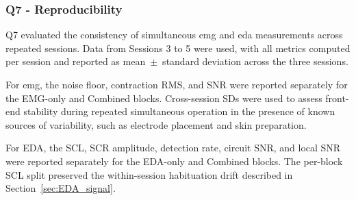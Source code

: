 \subsubsection{Q7 - Reproducibility}
\label{sec:q7_reproducibility}

Q7 evaluated the consistency of simultaneous \gls{emg} and \gls{eda} measurements across repeated sessions. Data from Sessions 3 to 5 were used, with all metrics computed per session and reported as mean~$\pm$~standard deviation across the three sessions.

For \gls{emg}, the noise floor, contraction RMS, and SNR were reported separately for the EMG-only and Combined blocks. Cross-session SDs were used to assess front-end stability during repeated simultaneous operation in the presence of known sources of variability, such as electrode placement and skin preparation.

For EDA, the SCL, SCR amplitude, detection rate, circuit SNR, and local SNR were reported separately for the EDA-only and Combined blocks. The per-block SCL split preserved the within-session habituation drift described in Section~\ref{sec:EDA_signal}.

